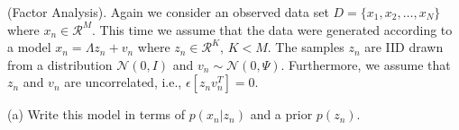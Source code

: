\documentclass[a4paper]{article}
\newcommand{\mc}[1]{\mathcal{#1}}
\def\r#1{{\color{red}#1}}
\def\b#1{{\color{blue}#1}}
\begin{document}
\begin{ExerciseList}
%
%
%
%
%


\Exercise[label={ex:6}] (Factor Analysis).
Again we consider an observed data set $D = \{x_1,x_2,\ldots,x_N\}$ where $x_n \in \mc{R}^M$.  This time we assume that the data were generated according to a model $x_n = \Lambda z_n + v_n$ where $z_n \in \mc{R}^K$, $K<M$. The samples $z_n$ are IID drawn from a distribution $\mc{N}(0,I)$ and $v_n \sim \mc{N}(0,\Psi)$. Furthermore, we assume that $z_n$ and $v_n$ are uncorrelated, i.e., $\epsilon[z_nv_n^T]=0$.

\medskip
(a) Write this model in terms of $p(x_n|z_n)$ and a prior $p(z_n)$.\\


\end{ExerciseList}
\end{document}
